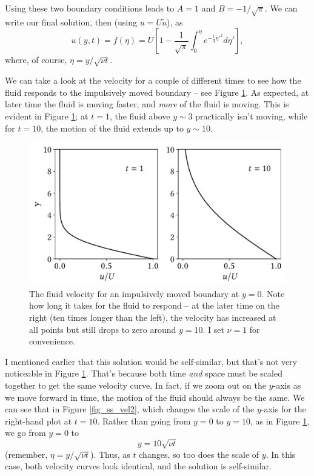 Using these two boundary conditions leads to $A=1$ and $B = -1/\sqrt{\pi}$.  We can write our final solution, then (using $u = U\tilde{u}$), as
\begin{equation}
u(y, t) = f(\eta) = U\left[ 1 - \frac{1}{\sqrt{\pi}} \int_0^\eta e^{-\tfrac{1}{4} \eta'^2} d\eta' \right],
\end{equation}
where, of course, $\eta = y / \sqrt{\nu t}$.

We can take a look at the velocity for a couple of different times to see how the fluid responds to the impulsively moved boundary -- see Figure \ref{fig_ss_vel1}.  As expected, at later time the fluid is moving faster, and \emph{more} of the fluid is moving.  This is evident in Figure \ref{fig_ss_vel1}; at $t=1$, the fluid above $y \sim 3$ practically isn't moving, while for $t=10$, the motion of the fluid extends up to $y \sim 10$.

\begin{figure}
\centering
\includegraphics[width=0.8\linewidth]{Figures/Chapter2/fig_ss_vel1}
\caption{The fluid velocity for an impulsively moved boundary at $y=0$.  Note how long it takes for the fluid to respond -- at the later time on the right (ten times longer than the left), the velocity has increased at all points but still drops to zero around $y=10$.  I set $\nu = 1$ for convenience.}
\label{fig_ss_vel1}
\end{figure}

I mentioned earlier that this solution would be self-similar, but that's not very noticeable in Figure \ref{fig_ss_vel1}.  That's because both time \emph{and} space must be scaled together to get the same velocity curve.  In fact, if we zoom out on the $y$-axis as we move forward in time, the motion of the fluid should always be the same.  We can see that in Figure \ref{fig_ss_vel2}, which changes the scale of the $y$-axis for the right-hand plot at $t=10$.  Rather than going from $y=0$ to $y=10$, as in Figure \ref{fig_ss_vel1}, we go from $y=0$ to
\[
y = {10}{\sqrt{\nu t}}
\]
(remember, $\eta = y / \sqrt{\nu t}$).  Thus, as $t$ changes, so too does the scale of $y$.  In this case, both velocity curves look identical, and the solution is self-similar.

